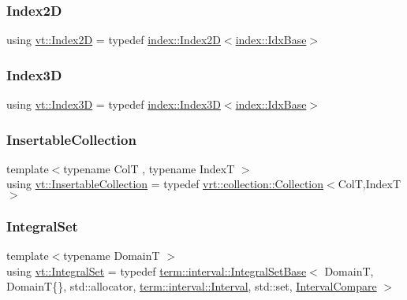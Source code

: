 \mbox{\label{namespacevt_a3bab786053b74a3d856fff1412ffa73a}} 
\subsubsection{\texorpdfstring{Index2D}{Index2D}}
{\footnotesize\ttfamily using \hyperlink{namespacevt_a3bab786053b74a3d856fff1412ffa73a}{vt\+::\+Index2D} = typedef \hyperlink{namespacevt_1_1index_a8373801efc8343f24d6e8ba57df40a69}{index\+::\+Index2D}$<$\hyperlink{namespacevt_1_1index_a0dbb8d47463da27c1436e8e4ddb02743}{index\+::\+Idx\+Base}$>$}

\mbox{\label{namespacevt_a2c8053bc5f2df4934272542fb3e5a0bc}} 
\subsubsection{\texorpdfstring{Index3D}{Index3D}}
{\footnotesize\ttfamily using \hyperlink{namespacevt_a2c8053bc5f2df4934272542fb3e5a0bc}{vt\+::\+Index3D} = typedef \hyperlink{namespacevt_1_1index_a2c09a09f7346d370a0bcbbfb0d4459cd}{index\+::\+Index3D}$<$\hyperlink{namespacevt_1_1index_a0dbb8d47463da27c1436e8e4ddb02743}{index\+::\+Idx\+Base}$>$}

\mbox{\label{namespacevt_a3fe0bbd9abf8f98d69d9f73c9f89e0a5}} 
\subsubsection{\texorpdfstring{Insertable\+Collection}{InsertableCollection}}
{\footnotesize\ttfamily template$<$typename ColT , typename IndexT $>$ \\
using \hyperlink{namespacevt_a3fe0bbd9abf8f98d69d9f73c9f89e0a5}{vt\+::\+Insertable\+Collection} = typedef \hyperlink{structvt_1_1vrt_1_1collection_1_1_collection}{vrt\+::collection\+::\+Collection}$<$ColT,IndexT$>$}

\mbox{\label{namespacevt_af8fc7210a3d8e598330cf3375857ef1e}} 
\subsubsection{\texorpdfstring{Integral\+Set}{IntegralSet}}
{\footnotesize\ttfamily template$<$typename DomainT $>$ \\
using \hyperlink{namespacevt_af8fc7210a3d8e598330cf3375857ef1e}{vt\+::\+Integral\+Set} = typedef \hyperlink{structvt_1_1term_1_1interval_1_1_integral_set_base}{term\+::interval\+::\+Integral\+Set\+Base}$<$ DomainT, DomainT\{\}, std\+::allocator, \hyperlink{structvt_1_1term_1_1interval_1_1_interval}{term\+::interval\+::\+Interval}, std\+::set, \hyperlink{namespacevt_ab51b754f1d22841f555246195fab9d41}{Interval\+Compare} $>$}

